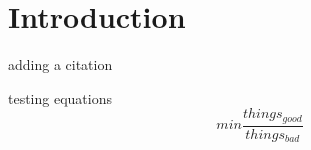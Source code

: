 \section{Introduction}

adding a citation \cite{Pouransari_2014}

testing equations
\begin{equation}
min \frac{things_{good}}{things_{bad}}
\end{equation}
